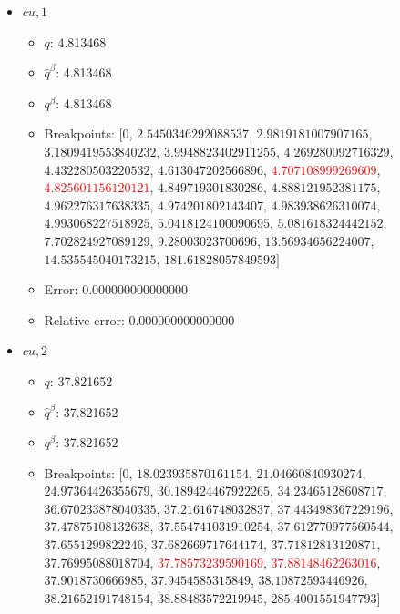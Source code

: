 \documentclass{article}%
\begin{document}
\begin{itemize}
\begin{itemize}
		\item $\hat{q}^\beta$: 138.863593%
		\item $q^\beta$: 138.863593%
		\item Breakpoints: $[$$0$, $9.898970403313276$, $28.333333333333332$, $42.69900440382105$, $48.67452649027746$, $79.83702775273511$, $87.16107999267206$, $118.88765652962957$, $128.52021081477858$, $131.69760457629607$, $132.12228195956155$, $135.81963163113545$, \textcolor{red}{$137.02923097052596$}, \textcolor{red}{$139.47623233772285$}, $140.31685261310218$, $140.7008934199032$, $141.79783607898793$, $142.4338700260237$, $144.67005099128556$, $144.70843093515643$, $147.07009017600456$, $147.48374761404892$, $149.84689443310864$, $720.0$$]$%
		\item Error: 0.000000000000000%
		\item Relative error: 0.000000000000000%
	\end{itemize}%
	\item $\textit{cu},1$%
	\begin{itemize}%
		\item $q$: 4.813468%
		\item $\hat{q}^\beta$: 4.813468%
		\item $q^\beta$: 4.813468%
		\item Breakpoints: $[$$0$, $2.5450346292088537$, $2.9819181007907165$, $3.1809419553840232$, $3.9948823402911255$, $4.269280092716329$, $4.432280503220532$, $4.613047202566896$, \textcolor{red}{$4.707108999269609$}, \textcolor{red}{$4.825601156120121$}, $4.849719301830286$, $4.888121952381175$, $4.962276317638335$, $4.974201802143407$, $4.983938626310074$, $4.993068227518925$, $5.0418124100090695$, $5.081618324442152$, $7.702824927089129$, $9.28003023700696$, $13.56934656224007$, $14.535545040173215$, $181.61828057849593$$]$%
		\item Error: 0.000000000000000%
		\item Relative error: 0.000000000000000%
	\end{itemize}%
	\item $\textit{cu},2$%
	\begin{itemize}%
		\item $q$: 37.821652%
		\item $\hat{q}^\beta$: 37.821652%
		\item $q^\beta$: 37.821652%
		\item Breakpoints: $[$$0$, $18.023935870161154$, $21.04660840930274$, $24.97364426355679$, $30.189424467922265$, $34.23465128608717$, $36.670233878040335$, $37.21616748032837$, $37.443498367229196$, $37.47875108132638$, $37.554741031910254$, $37.612770977560544$, $37.6551299822246$, $37.682669717644174$, $37.71812813120871$, $37.76995088018704$, \textcolor{red}{$37.78573239590169$}, \textcolor{red}{$37.88148462263016$}, $37.9018730666985$, $37.9454585315849$, $38.10872593446926$, $38.21652191748154$, $38.88483572219945$, $285.4001551947793$$]$%

\end{itemize}
\end{itemize}
\end{document}
